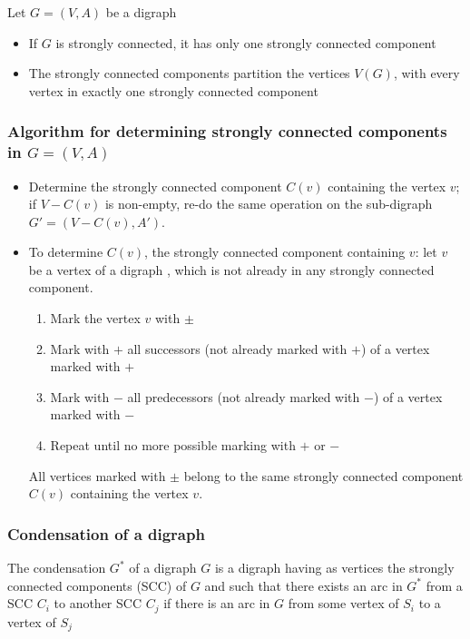 \documentclass[aspectratio=43]{beamer}
\begin{document}
\begin{frame}
	\begin{theorem}[Properties]
		Let $G=(V,A)$ be a digraph
	\begin{itemize}
	\item If $G$ is strongly connected, it has only one strongly connected component
	\item The strongly connected components partition the vertices $V(G)$, with every vertex in exactly one strongly connected component
	\end{itemize}
	\end{theorem}
\end{frame}



\begin{frame}\frametitle{Algorithm for determining strongly connected components in $G=(V,A)$}
	\begin{itemize}
	\item Determine the strongly connected component $C(v)$ containing the vertex $v$; if $V-C(v)$ is non-empty, re-do the same operation on the sub-digraph $G'=(V-C(v),A')$.
	\item To determine $C(v)$, the strongly connected component containing $v$: let $v$ be a vertex of a digraph , which is not already in any strongly connected component. 
	\begin{enumerate}
	\item Mark the vertex $v$ with $\pm$
	\item Mark with $+$ all successors (not already marked with $+$) of a vertex marked with $+$
	\item Mark with $-$ all predecessors (not already marked with $-$) of a vertex marked with $-$
	\item Repeat until no more possible marking with $+$ or $-$
	\end{enumerate}
	All vertices marked with $\pm$ belong to the same strongly connected component $C(v)$ containing the vertex $v$.
	\end{itemize}
\end{frame}

\begin{frame}\frametitle{Condensation of a digraph}
	\begin{definition}
		The condensation $G^*$ of a digraph $G$ is a digraph having as vertices the strongly connected components (SCC) of $G$ and such that there exists an arc in $G^*$ from a SCC $C_i$ to another SCC $C_j$ if there is an arc in $G$ from some vertex of $S_i$ to a vertex of $S_j$
	\end{definition}
\end{frame}
\end{document}
